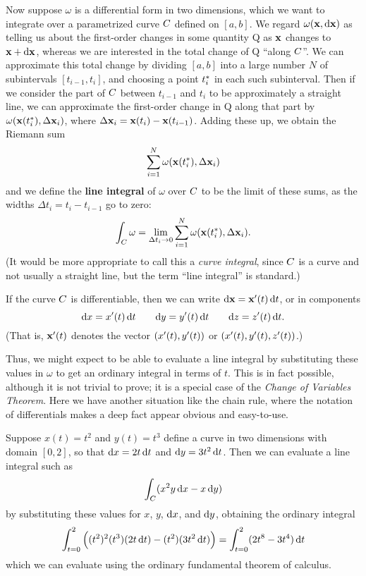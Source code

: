 \documentclass[12pt]{amsart}
\begin{document}
Now suppose $\omega$ is a differential form in two dimensions, which we want to integrate over a parametrized curve $C$ defined on $[a,b]$.
We regard $\omega(\mathbf{x},{\mathrm{d} \mathbf{x}})$ as telling us about the first-order changes in some quantity Q as $\mathbf{x}$ changes to $\mathbf{x}+{\mathrm{d} \mathbf{x}}$, whereas we are interested in the total change of Q ``along $C$''.
We can approximate this total change by dividing $[a,b]$ into a large number $N$ of subintervals $[t_{i-1},t_i]$, and choosing a point ${t}_{i}^*$ in each such subinterval.
Then if we consider the part of $C$ between $t_{i-1}$ and $t_i$ to be approximately a straight line, we can approximate the first-order change in Q along that part by $\omega(\mathbf{x}({t}_{i}^*),\Delta \mathbf{x}_i)$, where $\Delta\mathbf{x}_i = \mathbf{x}(t_i)-\mathbf{x}(t_{i-1})$.
Adding these up, we obtain the Riemann sum
\[ \sum_{i=1}^N \omega(\mathbf{x}({t}_{i}^*),\Delta \mathbf{x}_i) \]
and we define the \textbf{line integral} of $\omega$ over $C$ to be the limit of these sums, as the widths $\Delta t_i = t_i - t_{i-1}$ go to zero:
\begin{equation}
  \int_{C} \omega = \lim_{\Delta t_i \to 0} \sum_{i=1}^N \omega(\mathbf{x}({t}_{i}^*),\Delta \mathbf{x}_i).\label{eq:line-integral}
\end{equation}
(It would be more appropriate to call this a \textit{curve integral}, since $C$ is a curve and not usually a straight line, but the term ``line integral'' is standard.)

If the curve $C$ is differentiable, then we can write $\mathrm{d}\mathbf{x} = \mathbf{x}'(t)\,{\mathrm{d} t}$, or in components
\[{\mathrm{d} x} = x'(t)\,{\mathrm{d} t} \qquad {\ensuremath{\mathrm{d} y}} = y'(t) \,{\mathrm{d} t} \qquad {\ensuremath{\mathrm{d} z}} = z'(t)\,{\mathrm{d} t}. \]
(That is, $\mathbf{x}'(t)$ denotes the vector $(x'(t),y'(t))$ or $(x'(t),y'(t),z'(t))$.)

Thus, we might expect to be able to evaluate a line integral by substituting these values in $\omega$ to get an ordinary integral in terms of $t$.
This is in fact possible, although it is not trivial to prove; it is a special case of the \emph{Change of Variables Theorem}.
Here we have another situation like the chain rule, where the notation of differentials makes a deep fact appear obvious and easy-to-use.

\begin{eg}\label{eg:lineint-cov}
  Suppose $x(t) = t^2$ and $y(t) = t^3$ define a curve in two dimensions with domain $[0,2]$, so that ${\mathrm{d} x} = 2t\,{\mathrm{d} t}$ and ${\mathrm{d} y} = 3t^2\,{\mathrm{d} t}$.
  Then we can evaluate a line integral such as
  \[ \int_{C} (x^2 y \,{\mathrm{d} x} - x \,{\mathrm{d} y}) \]
  by substituting these values for $x$, $y$, ${\mathrm{d} x}$, and ${\mathrm{d} y}$, obtaining the ordinary integral
  \[ \int_{t=0}^2 \Big( (t^2)^2(t^3)(2t\,{\mathrm{d} t}) - (t^2)(3t^2\,{\mathrm{d} t})\Big)
  = \int_{t=0}^2 (2t^8 - 3t^4)\,{\mathrm{d} t}\]
  which we can evaluate using the ordinary fundamental theorem of calculus.
\end{eg}
\end{document}
